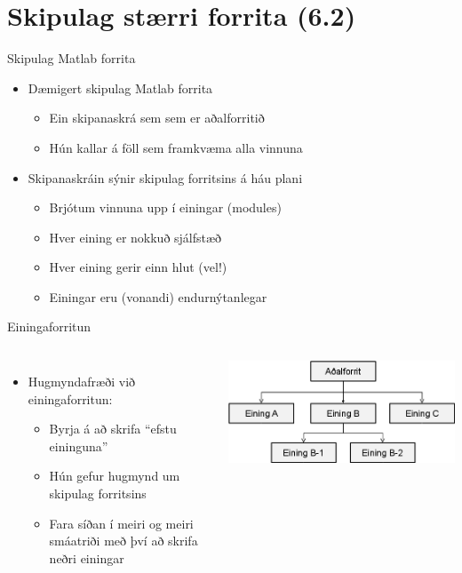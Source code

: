 \documentclass{beamer}
\begin{document}
\section{Skipulag stærri forrita (6.2)}

\begin{frame}{Skipulag Matlab forrita}
\begin{itemize}
 \item Dæmigert skipulag Matlab forrita
 \begin{itemize}
  \item Ein skipanaskrá sem sem er aðalforritið
  \item Hún kallar á föll sem framkvæma alla vinnuna
 \end{itemize}
 \item Skipanaskráin sýnir skipulag forritsins á háu plani
 \begin{itemize}
  \item Brjótum vinnuna upp í einingar (modules)
  \item Hver eining er nokkuð sjálfstæð
  \item Hver eining gerir einn hlut (vel!)
  \item Einingar eru (vonandi) endurnýtanlegar
 \end{itemize}
\end{itemize}
\end{frame}

\begin{frame}{Einingaforritun}
\begin{columns}
\begin{itemize}
 \item Hugmyndafræði við einingaforritun:
 \begin{itemize}
  \item Byrja á að skrifa ``efstu eininguna''
  \item Hún gefur hugmynd um skipulag forritsins
  \item Fara síðan í meiri og meiri smáatriði með því að skrifa neðri einingar
 \end{itemize}
\end{itemize}
\includegraphics[width=\linewidth]{../Pics/organization}
\end{columns}
\end{frame}
\end{document}
